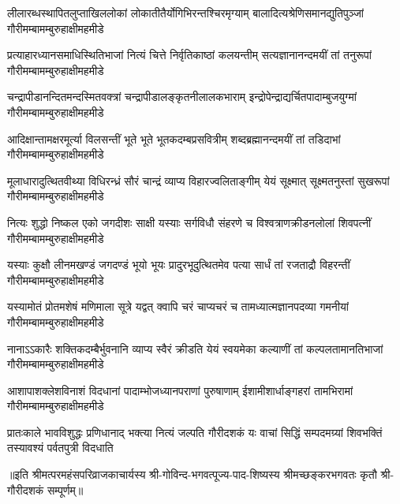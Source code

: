 


\fourlineindentedshloka
{लीलारब्धस्थापितलुप्ताखिललोकां}
{लोकातीतैर्योगिभिरन्तश्चिरमृग्याम्}
{बालादित्यश्रेणिसमानद्युतिपुञ्जां}
{गौरीमम्बामम्बुरुहाक्षीमहमीडे}

\fourlineindentedshloka
{प्रत्याहारध्यानसमाधिस्थितिभाजां}
{नित्यं चित्ते निर्वृतिकाष्ठां कलयन्तीम्}
{सत्यज्ञानानन्दमयीं तां तनुरूपां}
{गौरीमम्बामम्बुरुहाक्षीमहमीडे}

\fourlineindentedshloka
{चन्द्रापीडानन्दितमन्दस्मितवक्त्रां}
{चन्द्रापीडालङ्कृतनीलालकभाराम्}
{इन्द्रोपेन्द्राद्यर्चितपादाम्बुजयुग्मां}
{गौरीमम्बामम्बुरुहाक्षीमहमीडे}

\fourlineindentedshloka
{आदिक्षान्तामक्षरमूर्त्या विलसन्तीं}
{भूते भूते भूतकदम्बप्रसवित्रीम्}
{शब्दब्रह्मानन्दमयीं तां तडिदाभां}
{गौरीमम्बामम्बुरुहाक्षीमहमीडे}

\fourlineindentedshloka
{मूलाधारादुत्थितवीथ्या विधिरन्ध्रं}
{सौरं चान्द्रं व्याप्य विहारज्वलिताङ्गीम्}
{येयं सूक्ष्मात् सूक्ष्मतनुस्तां सुखरूपां}
{गौरीमम्बामम्बुरुहाक्षीमहमीडे}

\fourlineindentedshloka
{नित्यः शुद्धो निष्कल एको जगदीशः}
{साक्षी यस्याः सर्गविधौ संहरणे च}
{विश्वत्राणक्रीडनलोलां शिवपत्नीं}
{गौरीमम्बामम्बुरुहाक्षीमहमीडे}

\fourlineindentedshloka
{यस्याः कुक्षौ लीनमखण्डं जगदण्डं}
{भूयो भूयः प्रादुरभूदुत्थितमेव}
{पत्या सार्धं तां रजताद्रौ विहरन्तीं}
{गौरीमम्बामम्बुरुहाक्षीमहमीडे}

\fourlineindentedshloka
{यस्यामोतं प्रोतमशेषं मणिमाला}
{सूत्रे यद्वत् क्वापि चरं चाप्यचरं च}
{तामध्यात्मज्ञानपदव्या गमनीयां}
{गौरीमम्बामम्बुरुहाक्षीमहमीडे}

\fourlineindentedshloka
{नानाऽऽकारैः शक्तिकदम्बैर्भुवनानि}
{व्याप्य स्वैरं क्रीडति येयं स्वयमेका}
{कल्याणीं तां कल्पलतामानतिभाजां}
{गौरीमम्बामम्बुरुहाक्षीमहमीडे}

\fourlineindentedshloka
{आशापाशक्लेशविनाशं विदधानां}
{पादाम्भोजध्यानपराणां पुरुषाणाम्}
{ईशामीशार्धाङ्गहरां तामभिरामां}
{गौरीमम्बामम्बुरुहाक्षीमहमीडे}

\fourlineindentedshloka
{प्रातःकाले भावविशुद्धः प्रणिधानाद्}
{भक्त्या नित्यं जल्पति गौरीदशकं यः}
{वाचां सिद्धिं सम्पदमग्र्यां शिवभक्तिं}
{तस्यावश्यं पर्वतपुत्री विदधाति}

॥इति श्रीमत्परमहंसपरिव्राजकाचार्यस्य श्री-गोविन्द-भगवत्पूज्य-पाद-शिष्यस्य 
श्रीमच्छङ्करभगवतः कृतौ श्री-गौरीदशकं सम्पूर्णम्॥
